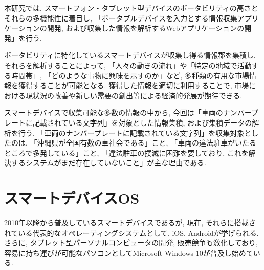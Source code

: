 本研究では, スマートフォン・タブレット型デバイスのポータビリティの高さとそれらの多機能性に着目し, 「ポータブルデバイスを入力とする情報収集アプリケーションの開発, および収集した情報を解析するWebアプリケーションの開発」を行う.

ポータビリティに特化しているスマートデバイスが収集し得る情報郡を集積し, それらを解析することによって, 「人々の動きの流れ」や「特定の地域で活動する時間帯」, 「どのような事物に興味を示すのか」など, 多種類の有用な市場情報を獲得することが可能となる.
獲得した情報を適切に利用することで, 市場における現状況の改善や新しい需要の創出等による経済的発展が期待できる.

スマートデバイスで収集可能な多数の情報の中から, 今回は「車両のナンバープレートに記載されている文字列」を対象とした情報集積, および集積データの解析を行う.
「車両のナンバープレートに記載されている文字列」を収集対象としたのは, 「沖縄県が全国有数の車社会である」こと, 「車両の違法駐車がいたるところで多発している」こと, 「違法駐車の撲滅に困難を要しており, これを解決するシステムがまだ存在していないこと」が主な理由である.

\section{スマートデバイスOS}
2010年以降から普及しているスマートデバイスであるが, 現在, それらに搭載されている代表的なオペレーティングシステムとして, iOS, Androidが挙げられる.
さらに, タブレット型パーソナルコンピュータの開発, 販売競争も激化しており, 容易に持ち運びが可能なパソコンとしてMicrosoft Windows 10が普及し始めている.

